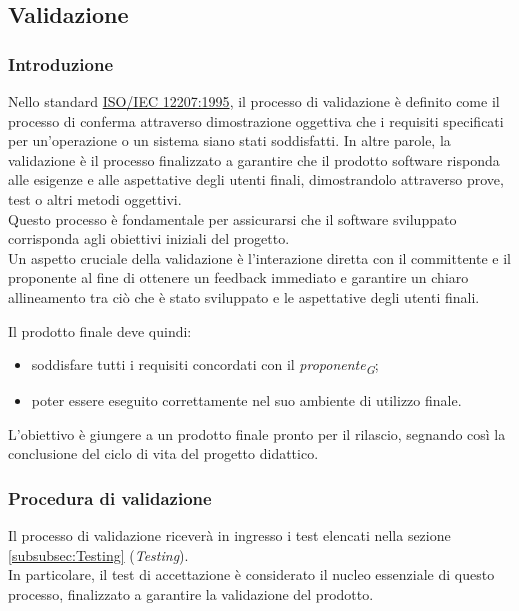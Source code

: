 \subsection{Validazione}

\subsubsection{Introduzione}
Nello standard \href{https://www.math.unipd.it/~tullio/IS-1/2009/Approfondimenti/ISO_12207-1995.pdf}{ISO/IEC 12207:1995}, il processo di validazione è definito come il processo di conferma attraverso dimostrazione oggettiva che i requisiti specificati per un'operazione o un sistema siano stati soddisfatti. In altre parole, la validazione è il processo finalizzato a garantire che il prodotto software risponda alle esigenze e alle aspettative degli utenti finali, dimostrandolo attraverso prove, test o altri metodi oggettivi. \\
Questo processo è fondamentale per assicurarsi che il software sviluppato corrisponda agli obiettivi iniziali del progetto. \\
Un aspetto cruciale della validazione è l'interazione diretta con il committente e il proponente al fine di ottenere un feedback immediato e garantire un chiaro allineamento tra ciò che è stato sviluppato e le aspettative degli utenti finali.

Il prodotto finale deve quindi: 
\begin{itemize}
    \item 
        soddisfare tutti i requisiti concordati con il \textit{proponente}\textsubscript{\textit{G}}; 
    \item 
        poter essere eseguito correttamente nel suo ambiente di utilizzo finale.
\end{itemize}

L'obiettivo è giungere a un prodotto finale pronto per il rilascio, segnando così la conclusione del ciclo di vita del progetto didattico. 

\subsubsection{Procedura di validazione}
Il processo di validazione riceverà in ingresso i test elencati nella sezione \ref{subsubsec:Testing} (\textit{Testing}). \\
In particolare, il test di accettazione è considerato il nucleo essenziale di questo processo, finalizzato a garantire la validazione del prodotto.

